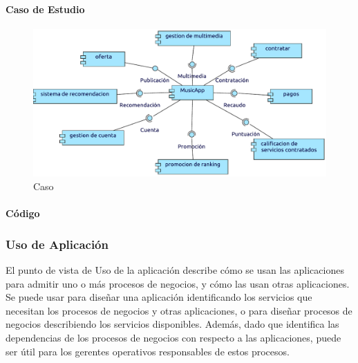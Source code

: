 \paragraph{Caso de Estudio}

\begin{figure}[h!]
	\centering
	\includegraphics[width=\linewidth]{Desarrollo/ArquitecturaEmpresarial/Aplicacion/imgs/estructura.pdf}
	\caption{Caso}
\end{figure}


\paragraph{Código}









\newpage

\subsubsection{Uso de Aplicación}
El punto de vista de Uso de la aplicación describe cómo se usan las aplicaciones para admitir uno o más procesos de negocios, y cómo las usan otras aplicaciones. Se puede usar para diseñar una aplicación identificando los servicios que necesitan los procesos de negocios y otras aplicaciones, o para diseñar procesos de negocios describiendo los servicios disponibles. Además, dado que identifica las dependencias de los procesos de negocios con respecto a las aplicaciones, puede ser útil para los gerentes operativos responsables de estos procesos.
